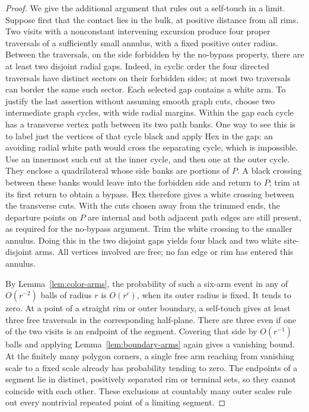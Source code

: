 \begin{proof}
We give the additional argument that rules out a self-touch in a limit.
Suppose first that the contact lies in the bulk, at positive distance from
all rims. Two visits with a nonconstant intervening excursion produce four
proper traversals of a sufficiently small annulus, with a fixed positive
outer radius. Between the traversals, on the side forbidden by the
no-bypass property, there are at least two disjoint radial gaps. Indeed, in cyclic order the
four directed traversals have distinct sectors on their forbidden sides;
at most two traversals can border the same such sector. Each selected
gap contains a white arm. To justify the last assertion without assuming
smooth graph cuts, choose two intermediate graph cycles, with wide radial
margins. Within the gap each cycle has a transverse vertex path between its
two path banks. One way to see this is to label just the vertices of that
cycle black and apply Hex in the gap: an avoiding radial white path would
cross the separating cycle, which is impossible. Use an innermost such cut
at the inner cycle, and then one at the outer cycle. They enclose a
quadrilateral whose side banks are portions of $P$. A black crossing between
these banks would leave into the forbidden side and return to $P$; trim at
its first return to obtain a bypass. Hex therefore gives a white crossing
between the transverse cuts. With the cuts chosen away from the trimmed
ends, the departure points on $P$ are internal and both adjacent path edges
are still present, as required for the no-bypass argument. Trim the white
crossing to the smaller annulus. Doing this in the two disjoint gaps yields
four black and two white site-disjoint arms. All vertices involved are free;
no fan edge or rim has entered this annulus.

By Lemma~\ref{lem:color-arms}, the probability of such a six-arm event in any
of $O(r^{-2})$ balls of radius $r$ is $O(r^{c})$, when its outer radius is
fixed. It tends to zero. At a point of a straight rim or outer boundary,
a self-touch gives at least three free traversals in the corresponding
half-plane. There are three even if one of the two visits is an endpoint
of the segment. Covering that side by $O(r^{-1})$ balls and applying
Lemma~\ref{lem:boundary-arms} again gives a vanishing bound. At the finitely
many polygon corners, a single free arm reaching from vanishing scale to a
fixed scale already has probability tending to zero. The endpoints of a
segment lie in distinct, positively separated rim or terminal sets, so they
cannot coincide with each other. These exclusions at countably many outer
scales rule out every nontrivial repeated point of a limiting segment.
\end{proof}

